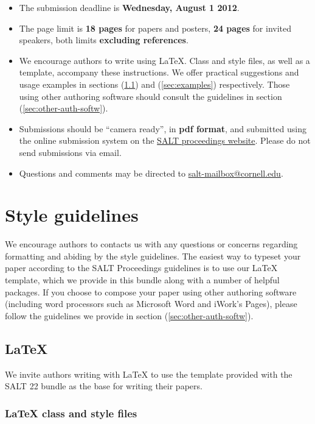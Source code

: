 \documentclass{salt}
\begin{document}
\begin{itemize}
  \item The submission deadline is \textbf{Wednesday, August 1 2012}.
  \item The page limit is \textbf{18 pages} for papers and posters, \textbf{24 pages} for invited speakers, both limits \textbf{excluding references}.
  \item We encourage authors to write using \LaTeX. Class and style files, as well as a template, accompany these instructions. We offer practical suggestions and usage examples in sections (\ref{sec:latex}) and (\ref{sec:examples}) respectively.  Those using other authoring software should consult the guidelines in section (\ref{sec:other-auth-softw}).
  \item Submissions should be  ``camera ready'', in \textbf{pdf format}, and submitted using the online submission system on the \href{http://www.elanguage.net/journals/index.php/salt}{SALT proceedings website}. Please do not send submissions via email.
  \item Questions and comments may be directed to \href{mailto:salt-mailbox@cornell.edu}{salt-mailbox@cornell.edu}.
\end{itemize}
  

\section{Style guidelines}\label{sec:style-guidelines}

We encourage authors to contacts us with any questions or concerns regarding formatting and abiding by the style guidelines. The easiest way to typeset your paper according to the SALT Proceedings guidelines is to use our \LaTeX{} template, which we provide in this bundle along with a number of helpful packages. If you choose to compose your paper using other authoring software (including word processors such as Microsoft Word and iWork's Pages), please follow the guidelines we provide in section (\ref{sec:other-auth-softw}).

\subsection{\LaTeX}\label{sec:latex}
We invite authors writing with \LaTeX{} to use the template provided with the SALT 22 bundle as the base for writing their papers. 

\subsubsection{\LaTeX{} class and style files}
\end{document}
